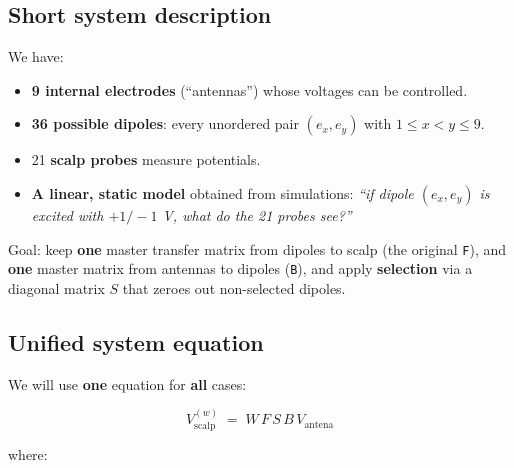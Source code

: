 \documentclass[../00_Main.tex]{subfiles}
\begin{document}
\bigskip

\subsection{Short system description}

We have:

\begin{itemize}
  \item \textbf{9 internal electrodes} (``antennas'') whose voltages can be controlled.
  \item \textbf{36 possible dipoles}: every unordered pair $(e_x, e_y)$ with $1 \le x < y \le 9$.
  \item 21 \textbf{scalp probes} measure potentials.
  \item \textbf{A linear, static model} obtained from simulations: \emph{``if dipole $(e_x, e_y)$ is excited with $+1/-1$ V, what do the 21 probes see?''}
\end{itemize}

Goal: keep \textbf{one} master transfer matrix from dipoles to scalp (the original \texttt{F}), and \textbf{one} master matrix from antennas to dipoles (\texttt{B}), and apply \textbf{selection} via a diagonal matrix $S$ that zeroes out non-selected dipoles.

\bigskip

\subsection{Unified system equation}

We will use \textbf{one} equation for \textbf{all} cases:

\[
\boxed{
V_{\text{scalp}}^{(w)} \;=\; W \, F \, S \, B \, V_{\text{antena}}
}
\]

where:
\end{document}
